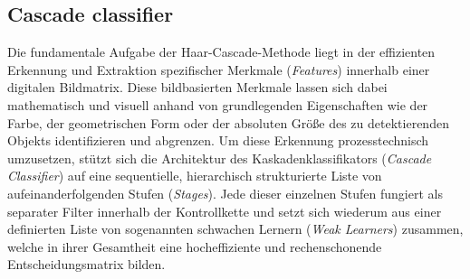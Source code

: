 \subsection{Cascade classifier}
Die fundamentale Aufgabe der Haar-Cascade-Methode liegt in der effizienten Erkennung und Extraktion spezifischer Merkmale (\textit{Features}) innerhalb einer digitalen Bildmatrix.\cite{Tamascelli2024} Diese bildbasierten Merkmale lassen sich dabei mathematisch und visuell anhand von grundlegenden Eigenschaften wie der Farbe, der geometrischen Form oder der absoluten Größe des zu detektierenden Objekts identifizieren und abgrenzen. \cite{apmonitor_cascade_2026} Um diese Erkennung prozesstechnisch umzusetzen, stützt sich die Architektur des Kaskadenklassifikators (\textit{Cascade Classifier}) auf eine sequentielle, hierarchisch strukturierte Liste von aufeinanderfolgenden Stufen (\textit{Stages}). Jede dieser einzelnen Stufen fungiert als separater Filter innerhalb der Kontrollkette und setzt sich wiederum aus einer definierten Liste von sogenannten schwachen Lernern (\textit{Weak Learners}) zusammen, welche in ihrer Gesamtheit eine hocheffiziente und rechenschonende Entscheidungsmatrix bilden. \cite{Tamascelli2024}
